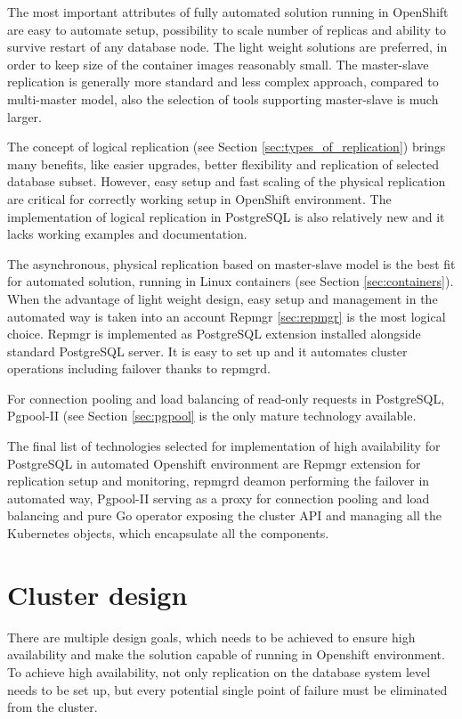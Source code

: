 \documentclass[
  digital, %
  twoside, %
  table,   %
  lof,     %
  lot,     %
]{fithesis3}
\begin{document}
The most important attributes of fully automated solution running in OpenShift are easy to automate setup, possibility to scale number of replicas and ability to survive restart of any database node. The light weight solutions are preferred, in order to keep size of the container images reasonably small. The master-slave replication is generally more standard and less complex approach, compared to multi-master model, also the selection of tools supporting master-slave is much larger.

The concept of logical replication (see Section \ref{sec:types_of_replication}) brings many benefits, like easier upgrades, better flexibility and replication of selected database subset. However, easy setup and fast scaling of the physical replication are critical for correctly working setup in OpenShift environment. The implementation of logical replication in PostgreSQL is also relatively new and it lacks working examples and documentation.

The asynchronous, physical replication based on master-slave model is the best fit for automated solution, running in Linux containers (see Section \ref{sec:containers}). When the advantage of light weight design, easy setup and management in the automated way is taken into an account Repmgr \ref{sec:repmgr} is the most logical choice. Repmgr is implemented as PostgreSQL extension installed alongside standard PostgreSQL server. It is easy to set up and it automates cluster operations including failover thanks to repmgrd.

For connection pooling and load balancing of read-only requests in PostgreSQL, Pgpool-II (see Section \ref{sec:pgpool} is the only mature technology available.

The final list of technologies selected for implementation of high availability for PostgreSQL in automated Openshift environment are Repmgr extension for replication setup and monitoring, repmgrd deamon performing the failover in automated way, Pgpool-II serving as a proxy for connection pooling and load balancing and pure Go operator exposing the cluster API and managing all the Kubernetes objects, which encapsulate all the components.

\section{Cluster design}
There are multiple design goals, which needs to be achieved to ensure high availability and make the solution capable of running in Openshift environment. To achieve high availability, not only replication on the database system level needs to be set up, but every potential single point of failure must be eliminated from the cluster.
\end{document}
